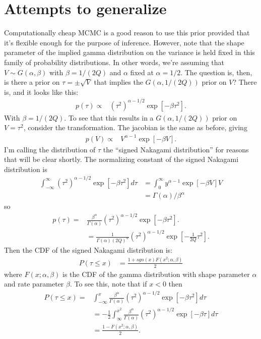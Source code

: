 \documentclass{article}
\begin{document}
\section{Attempts to generalize}
Computationally cheap MCMC is a good reason to use this prior provided that it's flexible enough for the purpose of inference. However, note that the shape parameter of the implied gamma distribution on the variance is held fixed in this family of probability distributions. In other words, we're assuming that $V\sim G(\alpha, \beta)$ with $\beta=1/(2Q)$ and $\alpha$ fixed at $\alpha=1/2$. The question is, then, is there a prior on $\tau=\pm \sqrt{V}$ that implies the $G(\alpha,1/(2Q))$ prior on $V$? There is, and it looks like this:
\begin{align*}
  p(\tau)\propto &(\tau^2)^{\alpha - 1/2}\exp\left[-\beta\tau^2\right].
\end{align*}
With $\beta=1/(2Q)$. To see that this results in a $G(\alpha,1/(2Q))$ prior on $V=\tau^2$, consider the transformation. The jacobian is the same as before, giving
\begin{align*}
  p(V)\propto & V^{\alpha-1}\exp\left[-\beta V\right].
\end{align*}
I'm calling the distribution of $\tau$ the ``signed Nakagami distribution'' for reasons that will be clear shortly. The normalizing constant of the signed Nakagami distribution is
\begin{align*}
  \int_{-\infty}^\infty (\tau^2)^{\alpha - 1/2}\exp\left[-\beta\tau^2\right]d\tau & = \int_{0}^\infty y^{\alpha -1} \exp\left[-\beta V\right]V \\
  & = \Gamma(\alpha)/\beta^\alpha
\end{align*}
so
\begin{align*}
p(\tau) = & \frac{\beta^\alpha}{\Gamma(\alpha)}(\tau^2)^{\alpha-1/2}\exp\left[-\beta\tau^2\right].\\
&= \frac{1}{\Gamma(\alpha) (2Q)^\alpha}(\tau^2)^{\alpha-1/2}\exp\left[-\frac{1}{2Q}\tau^2\right].
\end{align*}
Then the CDF of the signed Nakagami distribution is:
\begin{align*}
  P(\tau\leq x) & = \frac{1 + sgn(x)F(x^2;\alpha,\beta)}{2}
\end{align*}
where $F(x;\alpha,\beta)$ is the CDF of the gamma distribution with shape parameter $\alpha$ and rate parameter $\beta$. To see this, note that if $x<0$ then
\begin{align*}
  P(\tau \leq x) = &\int_{-\infty}^x \frac{\beta^\alpha}{\Gamma(\alpha) }(\tau^2)^{\alpha-1/2}\exp\left[-\beta\tau^2\right] d\tau \\
    &=-\frac{1}{2}\int_\infty^{x^2} \frac{\beta^\alpha}{\Gamma(\alpha) }(\tau^2)^{\alpha-1/2}\exp\left[-\beta \tau\right] d\tau\\
    &= \frac{1 - F(x^2;\alpha,\beta)}{2}.
\end{align*}
\end{document}
